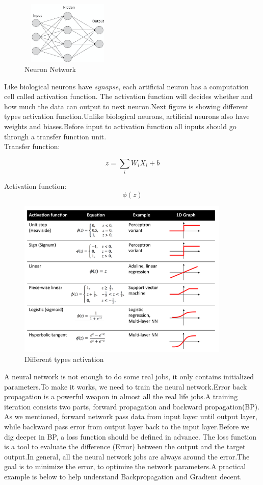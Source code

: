 \documentclass[12pt,a4paper]{report}
\begin{document}
\begin{figure}[h]
\centering
\includegraphics[height=3cm,width=0.4\textwidth]{nn1.png}
\caption{Neuron Network}
\end{figure}

\newpage

Like biological neurons have \textit{synapse}, each artificial neuron has a  computation cell called activation function. The activation function will decides whether and how much the data can output to next neuron.Next figure is showing different types activation function.Unlike biological neurons, artificial neurons also have weights and biases.Before input to activation function all inputs should go through a transfer function unit.\\

Transfer function:

\[z= \sum\limits_{i}W_i X_i +b\]

Activation function:
	\[\phi(z)\]
\begin{figure}[h]
\centering
\includegraphics[width=0.9\textwidth]{activation.png}
\caption{Different types activation}
\end{figure}

\newpage

A neural network is not enough to do some real jobs, it only contains initialized parameters.To make it works, we need to train the neural network.Error back propagation is a powerful weapon in almost all the real life jobs.A training iteration consists two parts, forward propagation and backward propagation(BP). As we mentioned, forward network pass data from input layer until output layer, while backward pass error from output layer back to the input layer.Before we dig deeper in BP, a loss function should be defined in advance. The loss function is a tool to evaluate the difference (Error) between the output and the target output.In general, all the neural network jobs are always around the error.The goal is to minimize the error, to optimize the network parameters.A practical example is below to help understand Backpropagation and Gradient decent.
\end{document}
